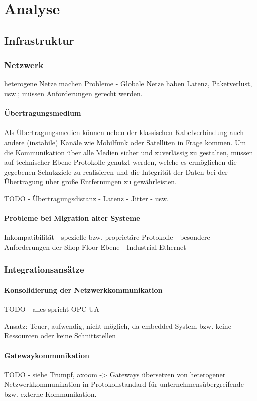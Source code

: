 \chapter{Analyse}

\section{Infrastruktur}


\subsection{Netzwerk}
heterogene Netze machen Probleme - Globale Netze haben Latenz, Paketverlust, usw.; müssen Anforderungen gerecht werden.

\subsubsection{Übertragungsmedium}
Als Übertragungsmedien können neben der klassischen Kabelverbindung auch andere (instabile) Kanäle wie Mobilfunk oder Satelliten in Frage kommen. Um die Kommunikation über alle Medien sicher und zuverlässig zu gestalten, müssen auf technischer Ebene Protokolle genutzt werden, welche es ermöglichen die gegebenen Schutzziele zu realisieren und die Integrität der Daten bei der Übertragung über große Entfernungen zu gewährleisten.

TODO - Übertragungsdistanz - Latenz - Jitter - usw.

\subsubsection{Probleme bei Migration alter Systeme}
Inkompatibilität - spezielle bzw. proprietäre Protokolle - besondere Anforderungen der Shop-Floor-Ebene - Industrial Ethernet


\subsection{Integrationsansätze}

\subsubsection{Konsolidierung der Netzwerkkommunikation}
TODO - alles spricht OPC UA

Ansatz: Teuer, aufwendig, nicht möglich, da embedded System bzw. keine Ressourcen oder keine Schnittstellen

\subsubsection{Gatewaykommunikation}
TODO - siehe Trumpf, axoom -> Gateways übersetzen von heterogener Netzwerkkommunikation in Protokollstandard für unternehmensübergreifende bzw. externe Kommunikation.


